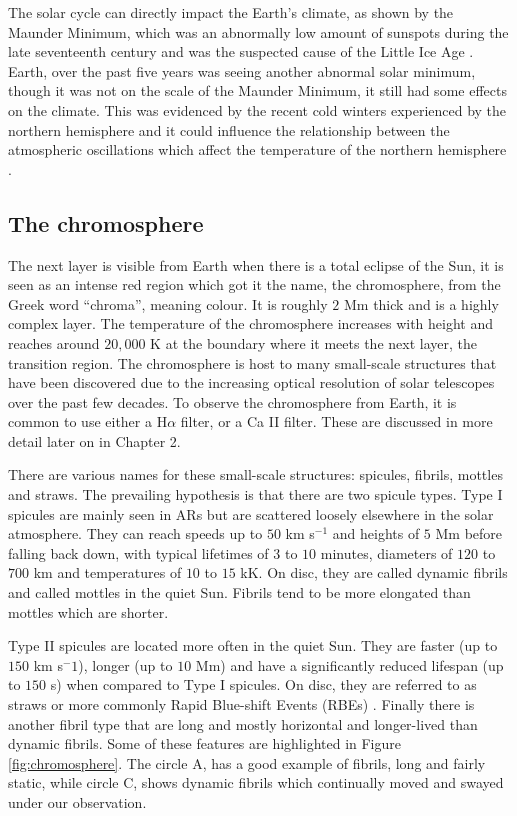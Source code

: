     The solar cycle can directly impact the Earth's climate, as shown by the Maunder Minimum, which was an abnormally low amount of sunspots during the late seventeenth century and was the suspected cause of the Little Ice Age \citep{FRIIS-CHRISTENSEN01111991,climate}.
    Earth, over the past five years was seeing another abnormal solar minimum, though it was not on the scale of the Maunder Minimum, it still had some effects on the climate.
    This was evidenced by the recent cold winters experienced by the northern hemisphere and it could influence the relationship between the atmospheric oscillations which affect the temperature of the northern hemisphere \citep{CWE,NAO,SCR}. 
   
\subsection{The chromosphere}
\label{chromo}

    The next layer is visible from Earth when there is a total eclipse of the Sun, it is seen as an intense red region which got it the name, the chromosphere, from the Greek word ``chroma'', meaning colour.
    It is roughly $2$ Mm thick and is a highly complex layer.
    The temperature of the chromosphere increases with height and reaches around $20,000$ K at the boundary where it meets the next layer, the transition region.    
    The chromosphere is host to many small-scale structures that have been discovered due to the increasing optical resolution of solar telescopes over the past few decades.
    To observe the chromosphere from Earth, it is common to use either a H$\alpha$ filter, or a Ca II filter. 
    These are discussed in more detail later on in Chapter 2. 
        
    There are various names for these small-scale structures: spicules, fibrils, mottles and straws.
    The prevailing hypothesis is that there are two spicule types.
    Type I spicules are mainly seen in ARs but are scattered loosely elsewhere in the solar atmosphere.
    They can reach speeds up to $50$ km s$^{-1}$ and heights of $5$ Mm before falling back down, with typical lifetimes of $3$ to $10$ minutes, diameters of $120$ to $700$ km and temperatures of $10$ to $15$ kK.
    On disc, they are called dynamic fibrils and called mottles in the quiet Sun.
    Fibrils tend to be more elongated than mottles which are shorter.
    
    Type II spicules are located more often in the quiet Sun.
    They are faster (up to $150$ km s$^-1$), longer (up to $10$ Mm) and have a significantly reduced lifespan (up to $150$ s) when compared to Type I spicules.
    On disc, they are referred to as straws or more commonly Rapid Blue-shift Events (RBEs) \citep{Zaqarashvili2009}.
    Finally there is another fibril type that are long and mostly horizontal and longer-lived than dynamic fibrils.
    Some of these features are highlighted in Figure \ref{fig:chromosphere}.
    The circle A, has a good example of fibrils, long and fairly static, while circle C, shows dynamic fibrils which continually moved and swayed under our observation.
    
